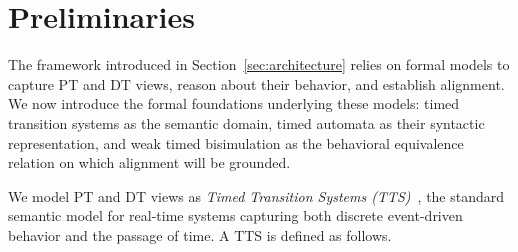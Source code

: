 \section{Preliminaries}\label{sec:preliminaries}




The framework introduced in Section~\ref{sec:architecture} relies on formal models to capture PT and DT views, reason about their behavior, and establish alignment. We now introduce the formal foundations underlying these models: timed transition systems as the semantic domain, timed automata as their syntactic representation, and weak timed bisimulation as the behavioral equivalence relation on which alignment will be grounded.

We model PT and DT views as \emph{Timed Transition Systems (TTS)}~\cite{ALUR1994183, Baier08}, the standard semantic model for real-time systems capturing both discrete event-driven behavior and the passage of time. A TTS is defined as follows.

%




